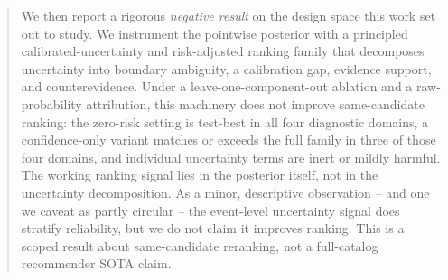 \begin{abstract}
We then report a rigorous \emph{negative result} on the design space this work
set out to study. We instrument the pointwise posterior with a principled
calibrated-uncertainty and risk-adjusted ranking family that decomposes
uncertainty into boundary ambiguity, a calibration gap, evidence support, and
counterevidence. Under a leave-one-component-out ablation and a
raw-probability attribution, this machinery does not improve same-candidate
ranking: the zero-risk setting is test-best in all four diagnostic domains, a
confidence-only variant matches or exceeds the full family in three of those
four domains, and individual uncertainty terms are inert or mildly harmful. The
working ranking signal lies in the posterior itself, not in the
uncertainty decomposition. As a minor, descriptive observation -- and one we
caveat as partly circular -- the event-level uncertainty signal does stratify
reliability, but we do not claim it improves ranking. This is a scoped result
about same-candidate reranking, not a full-catalog recommender SOTA claim.
\end{abstract}
